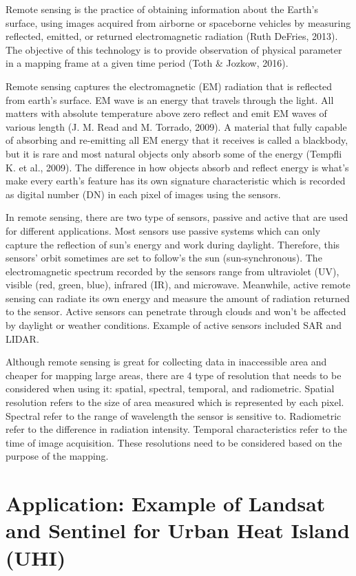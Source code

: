 \documentclass[
  letterpaper,
  DIV=11,
  numbers=noendperiod]{scrreprt}
\begin{document}
Remote sensing is the practice of obtaining information about the
Earth's surface, using images acquired from airborne or spaceborne
vehicles by measuring reflected, emitted, or returned electromagnetic
radiation (Ruth DeFries, 2013). The objective of this technology is to
provide observation of physical parameter in a mapping frame at a given
time period (Toth \& Jozkow, 2016).

Remote sensing captures the electromagnetic (EM) radiation that is
reflected from earth's surface. EM wave is an energy that travels
through the light. All matters with absolute temperature above zero
reflect and emit EM waves of various length (J. M. Read and M. Torrado,
2009). A material that fully capable of absorbing and re-emitting all EM
energy that it receives is called a blackbody, but it is rare and most
natural objects only absorb some of the energy (Tempfli K. et al.,
2009). The difference in how objects absorb and reflect energy is what's
make every earth's feature has its own signature characteristic which is
recorded as digital number (DN) in each pixel of images using the
sensors.

In remote sensing, there are two type of sensors, passive and active
that are used for different applications. Most sensors use passive
systems which can only capture the reflection of sun's energy and work
during daylight. Therefore, this sensors' orbit sometimes are set to
follow's the sun (sun-synchronous). The electromagnetic spectrum
recorded by the sensors range from ultraviolet (UV), visible (red,
green, blue), infrared (IR), and microwave. Meanwhile, active remote
sensing can radiate its own energy and measure the amount of radiation
returned to the sensor. Active sensors can penetrate through clouds and
won't be affected by daylight or weather conditions. Example of active
sensors included SAR and LIDAR.

Although remote sensing is great for collecting data in inaccessible
area and cheaper for mapping large areas, there are 4 type of resolution
that needs to be considered when using it: spatial, spectral, temporal,
and radiometric. Spatial resolution refers to the size of area measured
which is represented by each pixel. Spectral refer to the range of
wavelength the sensor is sensitive to. Radiometric refer to the
difference in radiation intensity. Temporal characteristics refer to the
time of image acquisition. These resolutions need to be considered based
on the purpose of the mapping.

\section{Application: Example of Landsat and Sentinel for Urban Heat
Island
(UHI)}\label{application-example-of-landsat-and-sentinel-for-urban-heat-island-uhi}
\end{document}

